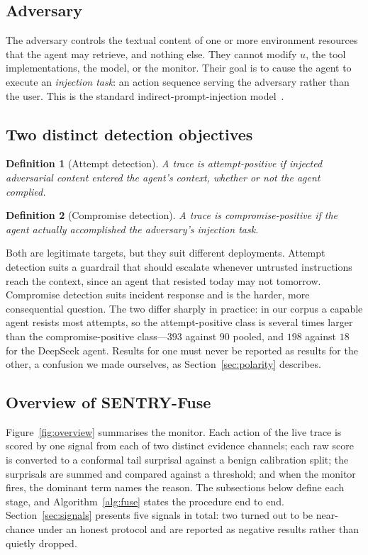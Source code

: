 \documentclass[pdflatex,sn-basic]{sn-jnl}%
\theoremstyle{thmstyleone}
\theoremstyle{thmstyletwo}
\theoremstyle{thmstylethree}
\newtheorem{definition}{Definition}
\begin{document}
\subsection{Adversary}

The adversary controls the textual content of one or more environment resources
that the agent may retrieve, and nothing else. They cannot modify $u$, the tool
implementations, the model, or the monitor. Their goal is to cause the agent to
execute an \emph{injection task}: an action sequence serving the adversary rather
than the user. This is the standard indirect-prompt-injection
model~\citep{debenedetti2024agentdojo}.

\subsection{Two distinct detection objectives}

\begin{definition}[Attempt detection]
A trace is \emph{attempt-positive} if injected adversarial content entered the
agent's context, whether or not the agent complied.
\end{definition}

\begin{definition}[Compromise detection]
A trace is \emph{compromise-positive} if the agent actually accomplished the
adversary's injection task.
\end{definition}

Both are legitimate targets, but they suit different deployments. Attempt
detection suits a guardrail that should
escalate whenever untrusted instructions reach the context, since an agent that
resisted today may not tomorrow. Compromise detection suits incident response and
is the harder, more consequential question. The two differ sharply in practice:
in our corpus a capable agent resists most attempts, so the attempt-positive
class is several times larger than the compromise-positive class---$393$ against
$90$ pooled, and $198$ against $18$ for the DeepSeek agent. Results
for one must never be reported as results for the other, a confusion we made
ourselves, as Section~\ref{sec:polarity} describes.

\subsection{Overview of SENTRY-Fuse}\label{sec:method}

Figure~\ref{fig:overview} summarises the monitor. Each action of the live trace is
scored by one signal from each of two distinct evidence channels; each raw score
is converted to a conformal tail surprisal against a benign calibration split; the
surprisals are summed and compared against a threshold; and when the monitor
fires, the dominant term names the reason. The subsections below define each
stage, and Algorithm~\ref{alg:fuse} states the procedure end to end. Section~\ref{sec:signals} presents five signals in total: two turned out to be
near-chance under an honest protocol and are reported as negative results rather
than quietly dropped.
\end{document}
